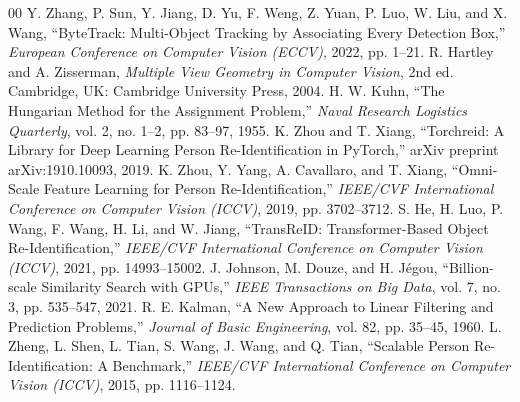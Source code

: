 \documentclass[conference]{IEEEtran}
\begin{document}
\begin{thebibliography}{00}
 Y. Zhang, P. Sun, Y. Jiang, D. Yu, F. Weng, Z. Yuan, P. Luo, W. Liu, and X. Wang, ``ByteTrack: Multi-Object Tracking by Associating Every Detection Box,'' \textit{European Conference on Computer Vision (ECCV)}, 2022, pp. 1--21.
 R. Hartley and A. Zisserman, \textit{Multiple View Geometry in Computer Vision}, 2nd ed. Cambridge, UK: Cambridge University Press, 2004.
 H. W. Kuhn, ``The Hungarian Method for the Assignment Problem,'' \textit{Naval Research Logistics Quarterly}, vol. 2, no. 1--2, pp. 83--97, 1955.
 K. Zhou and T. Xiang, ``Torchreid: A Library for Deep Learning Person Re-Identification in PyTorch,'' arXiv preprint arXiv:1910.10093, 2019.
 K. Zhou, Y. Yang, A. Cavallaro, and T. Xiang, ``Omni-Scale Feature Learning for Person Re-Identification,'' \textit{IEEE/CVF International Conference on Computer Vision (ICCV)}, 2019, pp. 3702--3712.
 S. He, H. Luo, P. Wang, F. Wang, H. Li, and W. Jiang, ``TransReID: Transformer-Based Object Re-Identification,'' \textit{IEEE/CVF International Conference on Computer Vision (ICCV)}, 2021, pp. 14993--15002.
 J. Johnson, M. Douze, and H. J\'egou, ``Billion-scale Similarity Search with GPUs,'' \textit{IEEE Transactions on Big Data}, vol. 7, no. 3, pp. 535--547, 2021.
 R. E. Kalman, ``A New Approach to Linear Filtering and Prediction Problems,'' \textit{Journal of Basic Engineering}, vol. 82, pp. 35--45, 1960.
 L. Zheng, L. Shen, L. Tian, S. Wang, J. Wang, and Q. Tian, ``Scalable Person Re-Identification: A Benchmark,'' \textit{IEEE/CVF International Conference on Computer Vision (ICCV)}, 2015, pp. 1116--1124.
\end{thebibliography}
\end{document}
